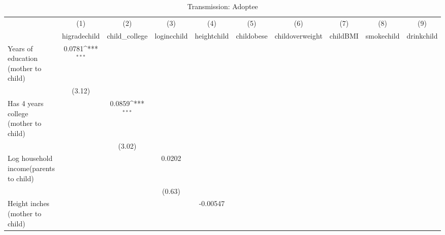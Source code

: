 \begin{table}[htbp]\centering
\def\sym#1{\ifmmode^{#1}\else\(^{#1}\)\fi}
\caption{Transmission: Adoptee}
\begin{tabular}{l*{9}{c}}
\hline\hline
            &\multicolumn{1}{c}{(1)}&\multicolumn{1}{c}{(2)}&\multicolumn{1}{c}{(3)}&\multicolumn{1}{c}{(4)}&\multicolumn{1}{c}{(5)}&\multicolumn{1}{c}{(6)}&\multicolumn{1}{c}{(7)}&\multicolumn{1}{c}{(8)}&\multicolumn{1}{c}{(9)}\\
            &\multicolumn{1}{c}{higradechild}&\multicolumn{1}{c}{child\_college}&\multicolumn{1}{c}{logincchild}&\multicolumn{1}{c}{heightchild}&\multicolumn{1}{c}{childobese}&\multicolumn{1}{c}{childoverweight}&\multicolumn{1}{c}{childBMI}&\multicolumn{1}{c}{smokechild}&\multicolumn{1}{c}{drinkchild}\\
\hline
Years of education (mother to child)&      0.0781\sym{***}&                     &                     &                     &                     &                     &                     &                     &                     \\
            &      (3.12)         &                     &                     &                     &                     &                     &                     &                     &                     \\
Has 4 years college (mother to child)&                     &      0.0859\sym{***}&                     &                     &                     &                     &                     &                     &                     \\
            &                     &      (3.02)         &                     &                     &                     &                     &                     &                     &                     \\
Log household income(parents to child)&                     &                     &      0.0202         &                     &                     &                     &                     &                     &                     \\
            &                     &                     &      (0.63)         &                     &                     &                     &                     &                     &                     \\
Height inches (mother to child)&                     &                     &                     &    -0.00547         &                     &                     &                     &                     &                     \\

\end{tabular}
\end{table}
